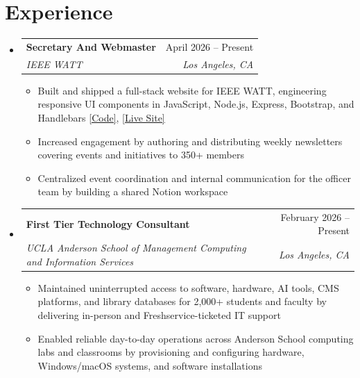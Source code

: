 \documentclass[letterpaper,10pt]{article}
\makeatletter
\newcommand{\resumeItem}[1]{
  \item\small{
    {#1 \vspace{-3pt}}
  }
}
\newcommand{\resumeSubheading}[4]{
  \vspace{-3pt}\item
    \begin{tabular*}{0.97\textwidth}[t]{l@{\extracolsep{\fill}}r}
      \textbf{#1} & #2 \\
      \textit{\small#3} & \textit{\small #4} \\
    \end{tabular*}\vspace{-7pt}
}
\newcommand{\resumeSubSubheading}[2]{
    \item
    \begin{tabular*}{0.97\textwidth}{l@{\extracolsep{\fill}}r}
      \textit{\small#1} & \textit{\small #2} \\
    \end{tabular*}\vspace{-7pt}
}
\newcommand{\resumeSubHeadingListStart}{\begin{itemize}[leftmargin=0.15in, label={}]}
\newcommand{\resumeSubHeadingListEnd}{\end{itemize}}
\newcommand{\resumeItemListStart}{\begin{itemize}}
\newcommand{\resumeItemListEnd}{\end{itemize}\vspace{-5pt}}
\makeatother
\begin{document}
\section{Experience}
  \resumeSubHeadingListStart
  
    \resumeSubheading
      {Secretary And Webmaster}{April 2026 -- Present}
      {IEEE WATT}{Los Angeles, CA}
      \resumeItemListStart
         \resumeItem{Built and shipped a full-stack website for IEEE WATT, engineering responsive UI components in JavaScript, Node.js, Express, Bootstrap, and Handlebars \href{https://github.com/uclawatt/watt-site}{[Code]}, \href{https://watt-site-blush.vercel.app/}{[Live Site]}}
         \resumeItem{Increased engagement by authoring and distributing weekly newsletters covering events and initiatives to 350+ members}
        \resumeItem{Centralized event coordination and internal communication for the officer team by building a shared Notion workspace}
        
    \resumeItemListEnd
 
  \resumeSubheading
      {First Tier Technology Consultant}{February 2026 -- Present}
      {UCLA Anderson School of Management Computing and Information Services}{Los Angeles, CA}
      \resumeItemListStart
    
        \resumeItem{Maintained uninterrupted access to software, hardware, AI tools, CMS platforms, and library databases for 2,000+ students and faculty by delivering in-person and Freshservice-ticketed IT support}
        \resumeItem{Enabled reliable day-to-day operations across Anderson School computing labs and classrooms by provisioning and configuring hardware, Windows/macOS systems, and software installations}
    
      \resumeItemListEnd


    

  \resumeSubHeadingListEnd


\end{document}
